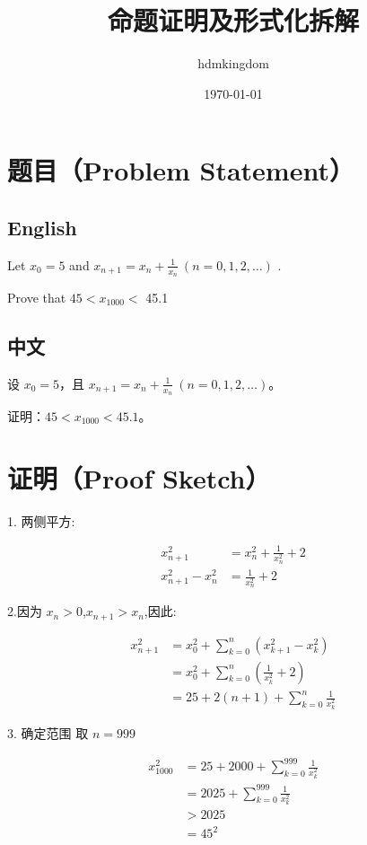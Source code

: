 \documentclass[11pt]{article}
\title{命题证明及形式化拆解}
\author{hdmkingdom}
\date{\today}
\begin{document}
\maketitle

\section*{题目（Problem Statement）}

\subsection*{English}
Let $x_{0}=5$ and $x_{n+1}=x_{n}+\frac{1} {x_{n}} ~ ( n=0, 1, 2, \ldots)$ . 

Prove that $4 5 < x_{1 0 0 0} <$ 45.1

\subsection*{中文}
设 $x_{0}=5$，且 $x_{n+1}=x_{n}+\frac{1}{x_{n}} ~ (n=0, 1, 2, \ldots)$。

证明：$45 < x_{1000} < 45.1$。

\section*{证明（Proof Sketch）}

1. 两侧平方:

\begin{align}
x_{n+1}^2 &= x_n^2 + \frac{1}{x_n^2} + 2\\
x_{n+1}^2 - x_n^2 &= \frac{1}{x_n^2} + 2 \label{eq:formula2}
\end{align}

2.因为 $x_n > 0$,$x_{n+1} > x_n$,因此:

\begin{align}
x_{n+1}^2 & = x_0^2 + \sum_{k=0}^{n}(x_{k+1}^2 - x_k^2)\\
& = x_0^2 + \sum_{k=0}^{n}(\frac{1}{x_k^2} + 2) \\
& = 25 + 2(n+1) + \sum_{k=0}^{n}\frac{1}{x_k^2} \label{eq:formula5} 
\end{align}

3. 确定范围 取 $n = 999$

\begin{align}
x_{1000}^2 & = 25 + 2000 + \sum_{k=0}^{999}\frac{1}{x_k^2}\\
& = 2025 + \sum_{k=0}^{999}\frac{1}{x_k^2} \\
& > 2025 \\
& = 45^2
\end{align}
\end{document}
